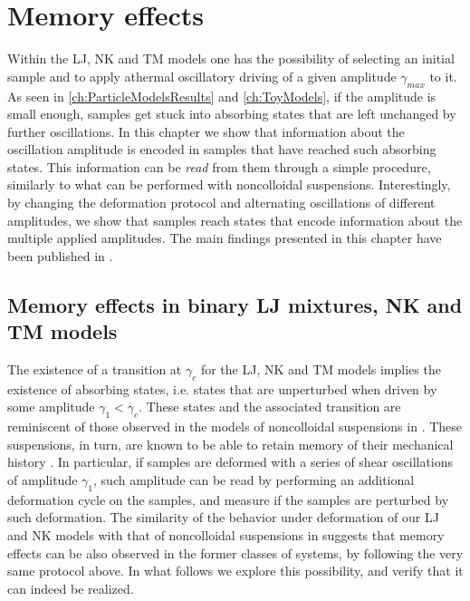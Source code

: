 \chapter{Memory effects \label{ch:Memory}}

Within the LJ, NK and TM models one has the possibility of selecting an initial sample and to apply athermal oscillatory driving of a given amplitude $\gamma_{max}$ to it. As seen in \autoref{ch:ParticleModelsResults} and \autoref{ch:ToyModels}, if the amplitude is small enough, samples get stuck into absorbing states that are left unchanged by further oscillations. In this chapter we show that information about the oscillation amplitude is encoded in samples that have reached such absorbing states. This information can be \emph{read} from them through a simple procedure, similarly to what can be performed with noncolloidal suspensions. Interestingly, by changing the deformation protocol and alternating oscillations of different amplitudes, we show that samples reach states that encode information about the multiple applied amplitudes.
The main findings presented in this chapter have been published in \cite{fiocco2014encoding}.

\section{Memory effects in binary LJ mixtures, NK and TM models}

The existence of a transition at $\gamma_{c}$ for the LJ, NK and TM models implies the existence of absorbing states, i.e. states that are unperturbed when driven by some amplitude $\gamma_{1} < \gamma_{c}$. These states and the associated transition are reminiscent of those observed in the models of noncolloidal suspensions in \cite{corte2008random}. These suspensions, in turn, are known to be able to retain memory of their mechanical history \cite{keim2011generic}. In particular, if samples are deformed with a series of shear oscillations of amplitude $\gamma_{1}$, such amplitude can be read by performing an additional deformation cycle on the samples, and measure if the samples are perturbed by such deformation.
The similarity of the behavior under deformation of our LJ and NK models with that of noncolloidal suspensions in \cite{corte2008random} suggests that memory effects can be also observed in the former classes of systems, by following the very same protocol above. In what follows we explore this possibility, and verify that it can indeed be realized. \\

